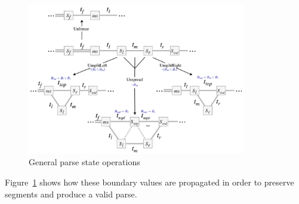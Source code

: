 \documentclass[12pt,a4paper,twoside,openright]{report}
\theoremstyle{definition}
\begin{document}
\begin{figure}[h]
  \centering
  \includegraphics[width=0.85\textwidth]{impl/parseOps.png}
  \caption{General parse state operations}
  \label{fig:parseStateOptions}
\end{figure}

  Figure~\ref{fig:parseStateOptions} shows how these boundary values are propagated in order to preserve segments and produce a valid parse.
\end{document}

